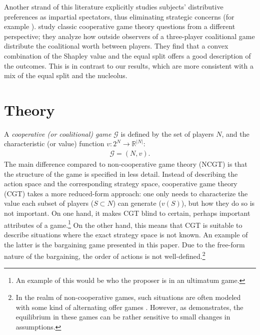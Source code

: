 \documentclass[12pt]{article}
\begin{document}
Another strand of this literature explicitly studies subjects' distributive preferences as impartial spectators, thus eliminating strategic concerns (for example \cite{cappelen2007pluralism, LuhanPoulsenRoos2019, AlmasCappelenTungodden2020, ClippelRozen2022}). \textcite{ClippelRozen2022} study classic cooperative game theory questions from a different perspective; they analyze how outside observers of a three-player coalitional game distribute the coalitional worth between players. They find that a convex combination of the Shapley value and the equal split offers a good description of the outcomes. This is in contrast to our results, which are more consistent with a mix of the equal split and the nucleolus.


\section{Theory} \label{sec:theory}

A \emph{cooperative (or coalitional) game} $\mathcal{G}$ is defined by the set of players $N$, and the characteristic (or value) function $v: 2^N \to \mathbb{R}^{|N|}$:
\begin{align*}
    \mathcal{G} = (N, v).
\end{align*}
The main difference compared to non-cooperative game theory (NCGT) is that the structure of the game is specified in less detail. Instead of describing the action space and the corresponding strategy space, cooperative game theory (CGT) takes a more reduced-form approach: one only needs to characterize the value each subset of players ($S \subset N$) can generate ($v(S)$), but how they do so is not important. On one hand, it makes CGT blind to certain, perhaps important attributes of a game.\footnote{An example of this would be who the proposer is in an ultimatum game.} On the other hand, this means that CGT is suitable to describe situations where the exact strategy space is not known. An example of the latter is the bargaining game presented in this paper. Due to the free-form nature of the bargaining, the order of actions is not well-defined.\footnote{In the realm of non-cooperative games, such situations are often modeled with some kind of alternating offer games \parencite[e.g.][]{rubinstein1982perfect,gul1989bargaining}. However, as \textcite{hart1996bargaining} demonstrates, the equilibrium in these games can be rather sensitive to small changes in assumptions.}
\end{document}
